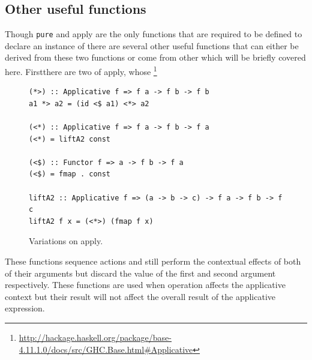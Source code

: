 \subsection{Other useful functions}
\label{sec:useful}
Though \texttt{pure} and apply are the only \DIFdelbegin {}\DIFdelend functions that are required to be defined to declare an instance of \DIFdelbegin {}\DIFdelend \DIFaddbegin \texttt{} \DIFaddend there are several other useful functions that can either be derived from these two functions or come from other \DIFdelbegin {}\DIFdelend \DIFaddbegin {}\DIFaddend which will be briefly covered here. First\DIFaddbegin \DIFadd{, }\DIFaddend there are two \DIFdelbegin {}\DIFdelend \DIFaddbegin {}\DIFaddend of apply, whose \DIFdelbegin {}\DIFdelend \DIFaddbegin {}\footnote{\texttt{} \texttt{\DIFadd{(<\$)}} \texttt{} \url{http://hackage.haskell.org/package/base-4.11.1.0/docs/src/GHC.Base.html\#Applicative}}
\DIFaddend 

\begin{figure}[t]
\DIFdelbeginFL %
\DIFdelendFL \DIFaddbeginFL \begin{lstlisting}
(*>) :: Applicative f => f a -> f b -> f b
a1 *> a2 = (id <$ a1) <*> a2

(<*) :: Applicative f => f a -> f b -> f a
(<*) = liftA2 const

(<$) :: Functor f => a -> f b -> f a
(<$) = fmap . const

liftA2 :: Applicative f => (a -> b -> c) -> f a -> f b -> f c
liftA2 f x = (<*>) (fmap f x)

\end{lstlisting}
\DIFaddendFL \caption{Variations on apply.}
\label{appVars}
\end{figure}

These functions sequence actions and still perform the contextual effects of both of their arguments but discard the value of the first and second argument respectively. These functions are used when \DIFdelbegin {}\DIFdelend \DIFaddbegin {}\DIFaddend operation affects the applicative context but their result will not affect the overall result of the applicative expression. 

